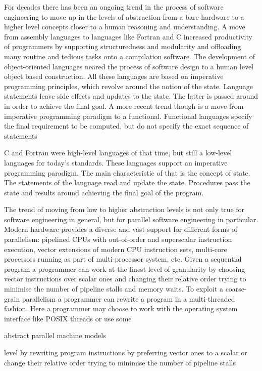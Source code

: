 \quad For decades there has been an ongoing trend in the process of software engineering to move up in the levels of abstraction from a bare hardware to a higher level concepts closer to a human reasoning and understanding.\newline\null
\quad A move from assembly languages to languages like Fortran and C increased productivity of programmers by supporting structuredness and modularity and offloading many routine and tedious tasks onto a compilation software. The development of object-oriented languages neared the process of software design to a human level object based construction. All these languages are based on imperative programming principles, which revolve around the notion of the state. Language statements leave side effects and updates to the state. The latter is passed around in order to achieve the final goal. A more recent trend though is a move from imperative programming paradigm to a functional. Functional languages specify the final requirement to be computed, but do not specify the exact sequence of statements   


C and Fortran were high-level languages of that time, but still a low-level languages for today's standards. These languages support an imperative programming paradigm. The main characteristic of that is the concept of state. The statements of the language read and update the state. Procedures pass the state and results around achieving the final goal of the program.   

\quad The trend of moving from low to higher abstraction levels is not only true for software engineering in general, but for parallel software engineering in particular. Modern hardware provides a diverse and vast support for different forms of parallelism: pipelined CPUs with out-of-order and superscalar instruction execution, vector extensions of modern CPU instruction sets, multi-core processors running as part of multi-processor system, etc. Given a sequential program a programmer can work at the finest level of granularity by choosing vector instructions over scalar ones and changing their relative order trying to minimise the number of pipeline stalls and memory waits. To exploit a coarse-grain parallelism a programmer can rewrite a program in a multi-threaded fashion. Here a programmer may choose to work with the operating system interface like POSIX threads or use some 

abstract parallel machine models   

level by rewriting program instructions by preferring vector ones to a scalar or change their relative order trying to minimise the number of pipeline stalls    

